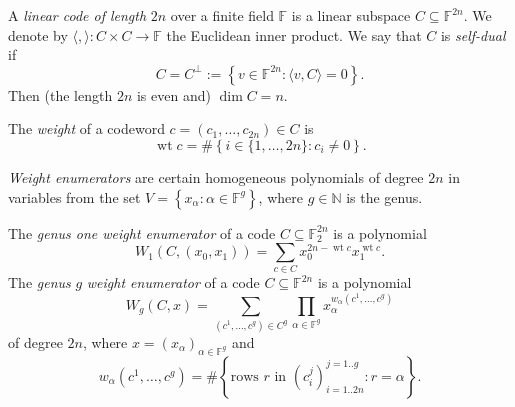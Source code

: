 \documentclass[reqno]{amsart} 
\begin{document}
A \emph{linear code of length} $2 n$ over a finite field $\mathbb{F}$ is a linear subspace $C \subseteq \mathbb{F}^{2 n}$.  We denote by $\langle , \rangle : C \times C \rightarrow \mathbb{F}$ the Euclidean inner product.  We say that $C$ is \emph{self-dual} if
\begin{equation*}
  C = C^\perp := \left\{ v \in \mathbb{F}^{2 n} : \langle v, C \rangle = 0 \right\}.
\end{equation*}
Then (the length $2 n$ is even and) $\dim C = n$.

The \emph{weight} of a codeword $c =(c_1, \dotsc, c_{2 n}) \in C$ is
\begin{equation*}
  \operatorname{wt}c = \# \left\{ i \in \{1, \dotsc, 2 n\} : c_i \neq 0 \right\}.
\end{equation*}

\emph{Weight enumerators} are certain homogeneous polynomials of degree $2 n$ in variables from the set $V = \left\{ x_\alpha : \alpha \in \mathbb{F}^g \right\}$, where $g \in \mathbb{N}$ is the genus.

The \emph{genus one weight enumerator} of a code $C \subseteq \mathbb{F}_2^{2 n}$ is a polynomial
\begin{equation*}
  W_1(C,(x_0, x_1))
  = \sum_{c \in C} x_0^{2 n - \operatorname{wt} c}
  x_1^{\operatorname{wt} c}.
\end{equation*}
The \emph{genus} $g$ \emph{weight enumerator} of a code $C \subseteq \mathbb{F}^{2 n}$ is a polynomial
\begin{equation*}
  W_g(C, x) = \sum_{(c^1, \dotsc, c^g) \in C^g }
  \prod_{\alpha \in \mathbb{F}^g}
  x_\alpha^{w_\alpha(c^1, \dotsc, c^g)}
\end{equation*}
of degree $2 n$, where $x =(x_\alpha)_{\alpha \in \mathbb{F}^g}$ and
\begin{equation*}
  w_\alpha(c^1, \dotsc, c^g)
  = \# \left\{ \text{rows $r$ in } (c_{i}^j)_{i = 1..2n}^{j = 1..g} : r = \alpha \right\}.
\end{equation*}
\end{document}
